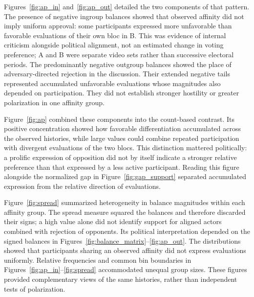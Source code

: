 \documentclass[conference,letterpaper]{IEEEtran}
\begin{document}
Figures~\ref{fig:ap_in} and~\ref{fig:ap_out} detailed the two components of that pattern. The presence of negative ingroup balances showed that observed affinity did not imply uniform approval: some participants expressed more unfavorable than favorable evaluations of their own bloc in B. This was evidence of internal criticism alongside political alignment, not an estimated change in voting preference; A and B were separate video sets rather than successive electoral periods. The predominantly negative outgroup balances showed the place of adversary-directed rejection in the discussion. Their extended negative tails represented accumulated unfavorable evaluations whose magnitudes also depended on participation. They did not establish stronger hostility or greater polarization in one affinity group.

Figure~\ref{fig:ap} combined these components into the count-based contrast. Its positive concentration showed how favorable differentiation accumulated across the observed histories, while large values could combine repeated participation with divergent evaluations of the two blocs. This distinction mattered politically: a prolific expression of opposition did not by itself indicate a stronger relative preference than that expressed by a less active participant. Reading this figure alongside the normalized gap in Figure~\ref{fig:gap_support} separated accumulated expression from the relative direction of evaluations.

Figure~\ref{fig:spread} summarized heterogeneity in balance magnitudes within each affinity group. The spread measure squared the balances and therefore discarded their signs; a high value alone did not identify support for aligned actors combined with rejection of opponents. Its political interpretation depended on the signed balances in Figures~\ref{fig:balance_matrix}--\ref{fig:ap_out}. The distributions showed that participants sharing an observed affinity did not express evaluations uniformly. Relative frequencies and common bin boundaries in Figures~\ref{fig:ap_in}--\ref{fig:spread} accommodated unequal group sizes. These figures provided complementary views of the same histories, rather than independent tests of polarization.
\end{document}
